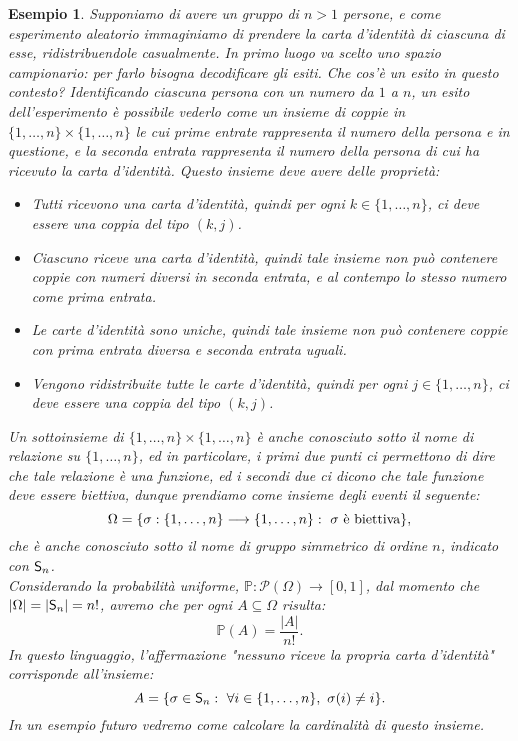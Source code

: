 \documentclass[11pt]{book}
\theoremstyle{Definizione}
\theoremstyle{TeoremaProposizioneLemmaCorollario}
\theoremstyle{OsservazioneNota}
\newtheorem{myes}{Esempio}[section]
\newcommand{\parti}[1]{\mathcal{P}\left({#1}\right)}
\renewcommand{\P}{\mathbb{P}}
\newcommand{\Sym}[1]{\textup{\textsf{S}}_{#1}}
\begin{document}
\begin{myes}\label{es:EsempioCarteIdentitàPt1}
Supponiamo di avere un gruppo di $n > 1$ persone, e come esperimento aleatorio immaginiamo di prendere la carta d'identità di ciascuna di esse, ridistribuendole casualmente. In primo luogo va scelto uno spazio campionario: per farlo bisogna decodificare gli esiti. Che cos'è un esito in questo contesto? Identificando ciascuna persona con un numero da $1$ a $n$, un esito dell'esperimento è possibile vederlo come un insieme di coppie in $\{1,\dots,n\}\times \{1,\dots,n\}$ le cui prime entrate rappresenta il numero della persona e in questione, e la seconda entrata rappresenta il numero della persona di cui ha ricevuto la carta d'identità. Questo insieme deve avere delle proprietà:
\begin{itemize}
\item Tutti ricevono una carta d'identità, quindi per ogni $k\in \{1,\dots,n\}$, ci deve essere una coppia del tipo $(k,j)$.
\item Ciascuno riceve una carta d'identità, quindi tale insieme non può contenere coppie con numeri diversi in seconda entrata, e al contempo lo stesso numero come prima entrata.
\item Le carte d'identità sono uniche, quindi tale insieme non può contenere coppie con prima entrata diversa e seconda entrata uguali.
\item Vengono ridistribuite tutte le carte d'identità, quindi per ogni $j\in \{1,\dots,n\}$, ci deve essere una coppia del tipo $(k,j)$.
\end{itemize}
Un sottoinsieme di $\{1,\dots,n\}\times \{1,\dots,n\}$ è anche conosciuto sotto il nome di relazione su $\{1,\dots,n\}$, ed in particolare, i primi due punti ci permettono di dire che tale relazione è una funzione, ed i secondi due ci dicono che tale funzione deve essere biettiva, dunque prendiamo come insieme degli eventi il seguente:
$$
\Omega = \{\sigma:\{1,\dots,n\}\longrightarrow \{1,\dots,n\}:\ \sigma \textup{ è biettiva}\},
$$
che è anche conosciuto sotto il nome di gruppo simmetrico di ordine $n$, indicato con $\Sym{n}$.\\
Considerando la probabilità uniforme, $\P:\parti{\Omega}\longrightarrow [0,1]$, dal momento che $|\Omega| = |\Sym{n}| = n!$, avremo che per ogni $A\subseteq \Omega$ risulta:
$$
\P(A) = \frac{|A|}{n!}.
$$
In questo linguaggio, l'affermazione "nessuno riceve la propria carta d'identità" corrisponde all'insieme:
$$
A = \{\sigma\in \Sym{n}:\ \forall i\in \{1,\dots,n\},\ \sigma(i) \neq i\}.
$$
In un esempio futuro vedremo come calcolare la cardinalità di questo insieme.
\end{myes}
\end{document}
